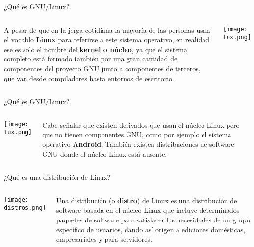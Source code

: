 \begin{frame}[c]{¿Qué es GNU/Linux?}
    \begin{columns}
        A pesar de que en la jerga cotidiana la mayoría de las personas usan
        el vocablo \textbf{Linux} para referirse a este sistema operativo, en
        realidad ese es solo el nombre del \textbf{kernel o núcleo}, ya que
        el sistema completo está formado también por una gran cantidad de
        componentes del proyecto GNU junto a componentes de terceros, que
        van desde compiladores hasta entornos de escritorio.
        \begin{center}
            \texttt{[image: tux.png]}
        \end{center}
    \end{columns}
\end{frame}

\begin{frame}[c]{¿Qué es GNU/Linux?}
    \begin{columns}
        \begin{center}
            \texttt{[image: tux.png]}
        \end{center}
        Cabe señalar que existen derivados que usan el núcleo Linux pero que
        no tienen componentes GNU, como por ejemplo el sistema operativo
        \textbf{Android}. También existen distribuciones de software GNU
        donde el núcleo Linux está ausente.
    \end{columns}
\end{frame}

\begin{frame}[c]{¿Qué es una distribución de Linux?}
    \begin{columns}
        \begin{center}
            \texttt{[image: distros.png]}
        \end{center}
        \pausa
        Una distribución (o \textbf{distro}) de Linux es una distribución
        de software basada en
        el núcleo Linux que incluye determinados paquetes de software para
        satisfacer las necesidades de un grupo específico de usuarios,
        dando así origen a ediciones domésticas, empresariales y para
        servidores.
    \end{columns}
\end{frame}

